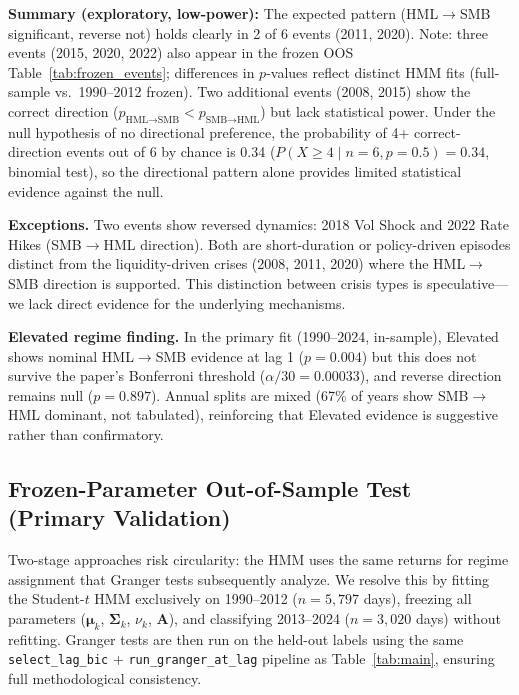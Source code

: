 \documentclass[sigconf,anonymous]{acmart}
\begin{document}
\textbf{Summary (exploratory, low-power):} The expected pattern (HML$\to$SMB significant, reverse not)
holds clearly in 2 of 6 events (2011, 2020).
Note: three events (2015, 2020, 2022) also appear in the frozen OOS Table~\ref{tab:frozen_events};
differences in $p$-values reflect distinct HMM fits (full-sample vs.\ 1990--2012 frozen). Two additional events (2008, 2015)
show the correct direction ($p_{\text{HML}\to\text{SMB}} < p_{\text{SMB}\to\text{HML}}$)
but lack statistical power. Under the null hypothesis of no directional preference,
the probability of 4+ correct-direction events out of 6 by chance is
0.34 ($P(X \geq 4 \mid n{=}6, p{=}0.5) = 0.34$, binomial test), so the directional
pattern alone provides limited statistical evidence against the null.

\textbf{Exceptions.} Two events show reversed dynamics: 2018 Vol Shock and
2022 Rate Hikes (SMB$\to$HML direction). Both are short-duration or
policy-driven episodes distinct from the liquidity-driven crises (2008, 2011, 2020)
where the HML$\to$SMB direction is supported. This distinction between crisis
types is speculative---we lack direct evidence for the underlying mechanisms.

\textbf{Elevated regime finding.} In the primary fit (1990--2024, in-sample), Elevated shows nominal
HML$\to$SMB evidence at lag 1 ($p = 0.004$) but this does not survive the
paper's Bonferroni threshold ($\alpha/30 = 0.00033$), and reverse direction
remains null ($p = 0.897$). Annual splits are mixed (67\% of years show SMB$\to$HML dominant, not tabulated),
reinforcing that Elevated evidence is suggestive rather than confirmatory.

\subsection{Frozen-Parameter Out-of-Sample Test (Primary Validation)}
\label{sec:frozen_oos}

Two-stage approaches risk circularity: the HMM uses the same returns for
regime assignment that Granger tests subsequently analyze.
We resolve this by fitting the Student-$t$ HMM exclusively on 1990--2012
($n = 5{,}797$ days), freezing all parameters
($\boldsymbol{\mu}_k$, $\boldsymbol{\Sigma}_k$, $\nu_k$, $\mathbf{A}$),
and classifying 2013--2024 ($n = 3{,}020$ days) without refitting.
Granger tests are then run on the held-out labels using the same
\texttt{select\_lag\_bic} + \texttt{run\_granger\_at\_lag} pipeline as Table~\ref{tab:main},
ensuring full methodological consistency.
\end{document}
